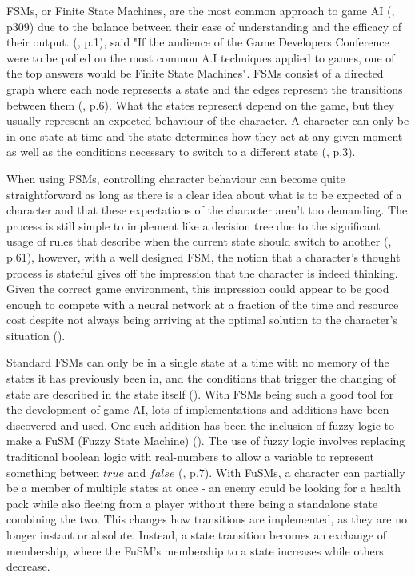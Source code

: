 \documentclass[11pt, a4paper]{article}
\begin{document}
FSMs, or Finite State Machines, are the most common approach to game AI (\cite{millington2019ai}, p309) due to the balance between their ease of understanding and the efficacy of their output. \citeauthor{orkin2006three} (\citeyear{orkin2006three}, p.1), said "If the audience of the Game Developers Conference were to be polled on the most common A.I techniques applied to games, one of the top answers would be Finite State Machines". FSMs consist of a directed graph where each node represents a state and the edges represent the transitions between them (\cite{tozour2002evolution}, p.6). What the states represent depend on the game, but they usually represent an expected behaviour of the character. A character can only be in one state at time and the state determines how they act at any given moment as well as the conditions necessary to switch to a different state (\cite{diller2004behavior}, p.3).

When using FSMs, controlling character behaviour can become quite straightforward as long as there is a clear idea about what is to be expected of a character and that these expectations of the character aren't too demanding. The process is still simple to implement like a decision tree due to the significant usage of rules that describe when the current state should switch to another (\cite{nareyek2004ai}, p.61), however, with a well designed FSM, the notion that a character's thought process is stateful gives off the impression that the character is indeed thinking. Given the correct game environment, this impression could appear to be good enough to compete with a neural network at a fraction of the time and resource cost despite not always being arriving at the optimal solution to the character's situation (\cite{sweetser2002current}).

Standard FSMs can only be in a single state at a time with no memory of the states it has previously been in, and the conditions that trigger the changing of state are described in the state itself (\cite{colledanchise2014performance}). With FSMs being such a good tool for the development of game AI, lots of implementations and additions have been discovered and used. One such addition has been the inclusion of fuzzy logic to make a FuSM (Fuzzy State Machine) (\cite{sweetser2002current}). The use of fuzzy logic involves replacing traditional boolean logic with real-numbers to allow a variable to represent something between $true$ and $false$ (\cite{tozour2002evolution}, p.7). With FuSMs, a character can partially be a member of multiple states at once - an enemy could be looking for a health pack while also fleeing from a player without there being a standalone state combining the two. This changes how transitions are implemented, as they are no longer instant or absolute. Instead, a state transition becomes an exchange of membership, where the FuSM's membership to a state increases while others decrease.
\end{document}
